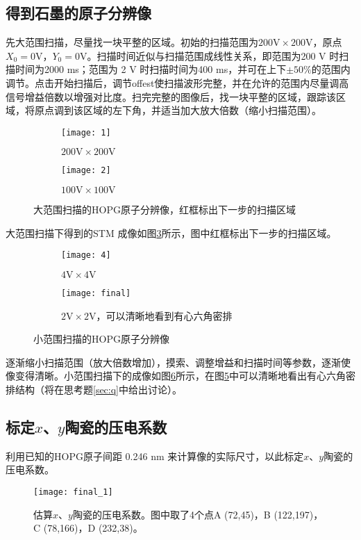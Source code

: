 \documentclass[aps,pre,12pt,preprint,onecolumn,showpacs,showkeys]{revtex4-1}
\def \V {\mathrm{V}}
\begin{document}
\subsection{得到石墨的原子分辨像}
先大范围扫描，尽量找一块平整的区域。初始的扫描范围为$200\mathrm{V} \times200\mathrm{V}$，原点$X_0=0\mathrm{V}$，$Y_0=0\mathrm{V}$。扫描时间近似与扫描范围成线性关系，即范围为200 V 时扫描时间为2000 ms；范围为 2 V 时扫描时间为400 ms，并可在上下$\pm 50\%$的范围内调节。点击开始扫描后，调节offest使扫描波形完整，并在允许的范围内尽量调高信号增益倍数以增强对比度。扫完完整的图像后，找一块平整的区域，跟踪该区域，将原点调到该区域的左下角，并适当加大放大倍数（缩小扫描范围）。

\begin{figure}[h]
\centering
	\begin{subfigure}[t]{60mm}
		\centering
		\texttt{[image: 1]}
		\caption{$200\V \times 200\V$}\label{fig:200times200}		
	\end{subfigure}
	\quad
	\begin{subfigure}[t]{60mm}
		\centering
		\texttt{[image: 2]}
		\caption{$100\V \times 100\V$}\label{fig:100times100}
	\end{subfigure}
	\caption{大范围扫描的HOPG原子分辨像，红框标出下一步的扫描区域}\label{fig:broad}
\end{figure}

大范围扫描下得到的STM 成像如图\ref{fig:broad}所示，图中红框标出下一步的扫描区域。
\begin{figure}[h]
\centering
	\begin{subfigure}[t]{60mm}
		\centering
		\texttt{[image: 4]}
		\caption{$4\V \times 4\V$}\label{fig:4times4}		
	\end{subfigure}
	\quad
	\begin{subfigure}[t]{60mm}
		\centering
		\texttt{[image: final]}
		\caption{$2\V \times 2\V$，可以清晰地看到有心六角密排}\label{fig:2times2}
	\end{subfigure}
	\caption{小范围扫描的HOPG原子分辨像}\label{fig:small}
\end{figure}

逐渐缩小扫描范围（放大倍数增加），摸索、调整增益和扫描时间等参数，逐渐使像变得清晰。小范围扫描下的成像如图\ref{fig:small}所示，在图\ref{fig:2times2}中可以清晰地看出有心六角密排结构（将在思考题\ref{sec:q}中给出讨论）。

\subsection{标定$x$、$y$陶瓷的压电系数}
利用已知的HOPG原子间距 0.246 nm 来计算像的实际尺寸，以此标定$x$、$y$陶瓷的压电系数。
\begin{figure}[h]
\centering
\texttt{[image: final\_1]}
\caption{\label{fig:measure}%
估算$x$、$y$陶瓷的压电系数。图中取了4个点A (72,45)，B (122,197)，C (78,166)，D (232,38)。}
\end{figure}
\end{document}
